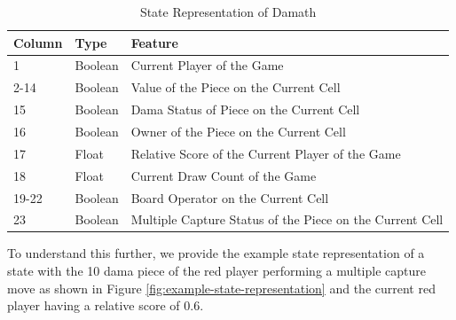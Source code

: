 \begin{table}[H]
  \centering
  \begin{tabular}{lll}
    \hline 
    Column & Type    & Feature                                                  \\ \hline
    1         & Boolean & Current Player of the Game                               \\
    2-14      & Boolean & Value of the Piece on the Current Cell                   \\
    15        & Boolean & Dama Status of Piece on the Current Cell                 \\
    16        & Boolean & Owner of the Piece on the Current Cell                   \\
    17        & Float   & Relative Score of the Current Player of the Game         \\
    18        & Float   & Current Draw Count of the Game                           \\
    19-22     & Boolean & Board Operator on the Current Cell                       \\
    23        & Boolean & Multiple Capture Status of the Piece on the Current Cell \\ \hline
  \end{tabular}
  \caption{State Representation of Damath}
  \label{tab:state-representation-damath}
\end{table}

To understand this further, we provide the example state representation of a state with the 10 dama piece of the red player performing a multiple capture move as shown in Figure \ref{fig:example-state-representation} and the current red player having a relative score of 0.6.

\newcommand{\gz}{\textcolor{black!10}{0}}
\newcommand{\gs}{\textcolor{black!10}{0.6}}
\newcommand{\go}{\textcolor{black!10}{1}}
\newcommand{\rz}{\textcolor{red}{0}}
\newcommand{\rs}{\textcolor{red}{0.6}}
\newcommand{\ro}{\textcolor{red}{1}}
\setcounter{MaxMatrixCols}{23}


